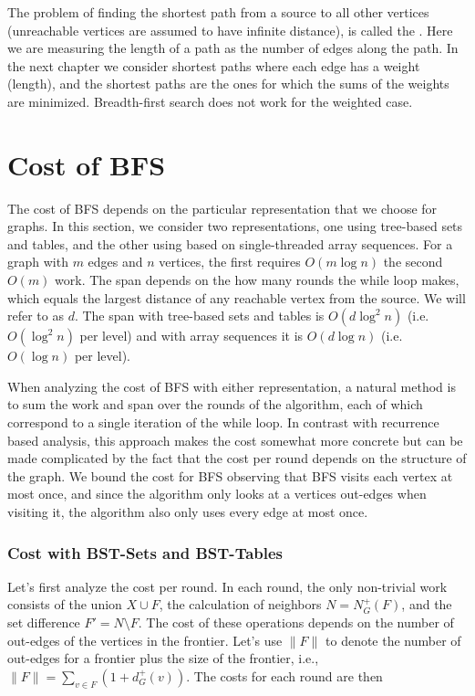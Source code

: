 The problem of finding the shortest path from a source to all other 
vertices (unreachable vertices are assumed to have infinite distance),
is called the .  Here we are 
measuring the length of a path as the number of edges along the path. 
In the next chapter we consider shortest paths where each edge has a 
weight (length), and the shortest paths are the ones for which the sums of 
the weights are minimized.    Breadth-first search does not work for the 
weighted case. 



\section{Cost of BFS}

The cost of BFS depends on the particular representation that we
choose for graphs.  In this section, we consider two representations,
one using tree-based sets and tables, and the other using based on
single-threaded array sequences.  For a graph with $m$ edges and $n$
vertices, the first requires $O(m \log n)$ the second $O(m)$ work.
The span depends on the how many rounds the while loop makes, which
equals the largest distance of any reachable vertex from the source.
We will refer to as $d$.  The span with tree-based sets and tables is
$O(d \log^2n)$ (i.e. $O(\log^2 n)$ per level) and with array sequences
it is $O(d \log n)$ (i.e. $O(\log n)$ per level).

When analyzing the cost of BFS with either representation, a natural
method is to sum the work and span over the rounds of the algorithm,
each of which correspond to a single iteration of the while loop.  
%
In contrast with recurrence based analysis, this approach makes the
cost somewhat more concrete but can be made complicated by the fact
that the cost per round depends on the structure of the graph.  
%
We bound the cost for BFS observing that BFS visits each vertex at
most once, and since the algorithm only looks at a vertices out-edges
when visiting it, the algorithm also only uses every edge at most once.


\subsubsection{Cost with BST-Sets and BST-Tables}

Let's first analyze the cost per round.  In each round, the only
non-trivial work consists of the union $X \cup F$, 
%
the calculation of neighbors $N = N_G^+(F)$, and
%
the set difference $F' = N \setminus F$.
%
The cost of these operations depends on the number of out-edges of the
vertices in the frontier.  Let's use $\|F\|$
 to denote the number of
out-edges for a frontier plus the size of the frontier, i.e., $\|F\| =
\sum_{v \in F} (1 + d_G^+(v))$.  The costs for each round are then

